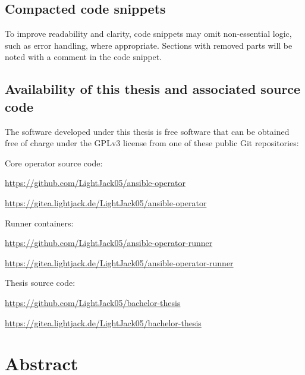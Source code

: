 \documentclass[
	12pt, %
	a4paper,
	liststotoc, %
	bibtotoc, %
	pointlessnumbers, %
	headsepline, %
	footsepline, %
	oneside %
	]{scrbook} %
\begin{document}
\section*{Compacted code snippets}
To improve readability and clarity, code snippets may omit non-essential logic, such as error handling, where appropriate. Sections with removed parts will be noted with a comment in the code snippet.

\section*{Availability of this thesis and associated source code}
The software developed under this thesis is free software that can be obtained free of charge under the GPLv3 license from one of these public Git repositories:

Core operator source code:

\href{https://github.com/LightJack05/ansible-operator}{https://github.com/LightJack05/ansible-operator}

\href{https://gitea.lightjack.de/LightJack05/ansible-operator}{https://gitea.lightjack.de/LightJack05/ansible-operator}

Runner containers:

\href{https://github.com/LightJack05/ansible-operator-runner}{https://github.com/LightJack05/ansible-operator-runner}

\href{https://gitea.lightjack.de/LightJack05/ansible-operator-runner}{https://gitea.lightjack.de/LightJack05/ansible-operator-runner}

Thesis source code:

\href{https://github.com/LightJack05/bachelor-thesis}{https://github.com/LightJack05/bachelor-thesis}

\href{https://gitea.lightjack.de/LightJack05/bachelor-thesis}{https://gitea.lightjack.de/LightJack05/bachelor-thesis}


\chapter*{Abstract}



\newpage
\tableofcontents{}
\end{document}
